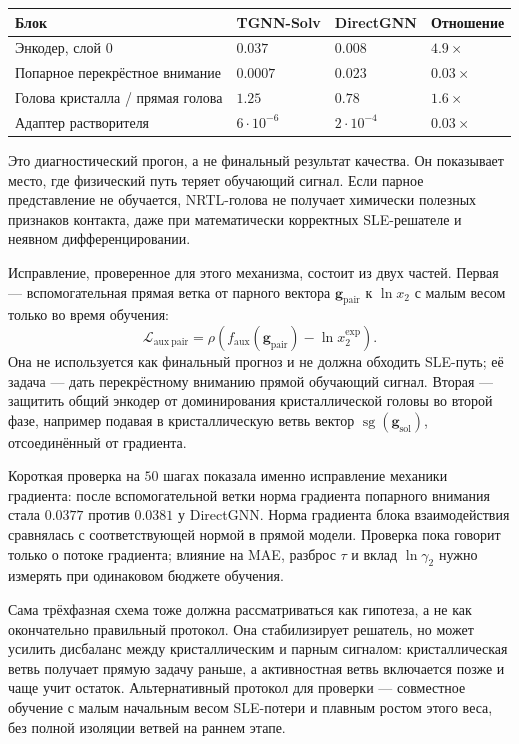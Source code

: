 \documentclass[11pt]{article}
\theoremstyle{definition}
\begin{document}
\begin{center}
\small
\begin{tabularx}{0.86\textwidth}{Y C{2.1cm} C{2.1cm} C{2.1cm}}
\toprule
Блок & TGNN-Solv & DirectGNN & Отношение \\
\midrule
Энкодер, слой 0 & $0.037$ & $0.008$ & $4.9\times$ \\
Попарное перекрёстное внимание & $0.0007$ & $0.023$ & $0.03\times$ \\
Голова кристалла / прямая голова & $1.25$ & $0.78$ & $1.6\times$ \\
Адаптер растворителя & $6\cdot10^{-6}$ & $2\cdot10^{-4}$ & $0.03\times$ \\
\bottomrule
\end{tabularx}
\end{center}

Это диагностический прогон, а не финальный результат качества. Он показывает место, где физический путь теряет обучающий сигнал. Если парное представление не обучается, NRTL-голова не получает химически полезных признаков контакта, даже при математически корректных SLE-решателе и неявном дифференцировании.

Исправление, проверенное для этого механизма, состоит из двух частей. Первая --- вспомогательная прямая ветка от парного вектора $\mathbf g_{\mathrm{pair}}$ к $\ln x_2$ с малым весом только во время обучения:
\begin{equation*}
    \mathcal L_{\mathrm{aux\ pair}}
    =
    \rho\!\left(f_{\mathrm{aux}}(\mathbf g_{\mathrm{pair}})-\ln x_2^{\mathrm{exp}}\right).
\end{equation*}
Она не используется как финальный прогноз и не должна обходить SLE-путь; её задача --- дать перекрёстному вниманию прямой обучающий сигнал. Вторая --- защитить общий энкодер от доминирования кристаллической головы во второй фазе, например подавая в кристаллическую ветвь вектор $\operatorname{sg}(\mathbf g_{\mathrm{sol}})$, отсоединённый от градиента.

Короткая проверка на $50$ шагах показала именно исправление механики градиента: после вспомогательной ветки норма градиента попарного внимания стала $0.0377$ против $0.0381$ у DirectGNN. Норма градиента блока взаимодействия сравнялась с соответствующей нормой в прямой модели. Проверка пока говорит только о потоке градиента; влияние на MAE, разброс $\tau$ и вклад $\ln\gamma_2$ нужно измерять при одинаковом бюджете обучения.

Сама трёхфазная схема тоже должна рассматриваться как гипотеза, а не как окончательно правильный протокол. Она стабилизирует решатель, но может усилить дисбаланс между кристаллическим и парным сигналом: кристаллическая ветвь получает прямую задачу раньше, а активностная ветвь включается позже и чаще учит остаток. Альтернативный протокол для проверки --- совместное обучение с малым начальным весом SLE-потери и плавным ростом этого веса, без полной изоляции ветвей на раннем этапе.
\end{document}
